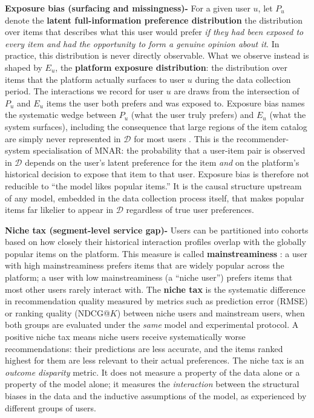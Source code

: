\documentclass[11pt,a4paper]{report}
\begin{document}
\textbf{Exposure bias (surfacing and missingness)-}
For a given user $u$, let $P_u$ denote the \textbf{latent full-information preference distribution} the distribution over items that describes what this user would prefer \emph{if they had been exposed to every item and had the opportunity to form a genuine opinion about it}. In practice, this distribution is never directly observable. What we observe instead is shaped by $E_u$, the \textbf{platform exposure distribution}: the distribution over items that the platform actually surfaces to user $u$ during the data collection period. The interactions we record for user $u$ are draws from the intersection of $P_u$ and $E_u$ items the user both prefers and was exposed to. Exposure bias names the systematic wedge between $P_u$ (what the user truly prefers) and $E_u$ (what the system surfaces), including the consequence that large regions of the item catalog are simply never represented in $\mathcal{D}$ for most users \citep{marlin2009mnar, schnabel2016ips}. This is the recommender-system specialisation of MNAR: the probability that a user-item pair is observed in $\mathcal{D}$ depends on the user's latent preference for the item \emph{and} on the platform's historical decision to expose that item to that user. Exposure bias is therefore not reducible to ``the model likes popular items.'' It is the causal structure upstream of any model, embedded in the data collection process itself, that makes popular items far likelier to appear in $\mathcal{D}$ regardless of true user preferences.

\textbf{Niche tax (segment-level service gap)-}
Users can be partitioned into cohorts based on how closely their historical interaction profiles overlap with the globally popular items on the platform. This measure is called \textbf{mainstreaminess} \citep{abdollahpouri2021usercentered}: a user with high mainstreaminess prefers items that are widely popular across the platform; a user with low mainstreaminess (a ``niche user'') prefers items that most other users rarely interact with. The \textbf{niche tax} is the systematic difference in recommendation quality measured by metrics such as prediction error (RMSE) or ranking quality (NDCG@$K$) between niche users and mainstream users, when both groups are evaluated under the \emph{same} model and experimental protocol. A positive niche tax means niche users receive systematically worse recommendations: their predictions are less accurate, and the items ranked highest for them are less relevant to their actual preferences. The niche tax is an \emph{outcome disparity} metric. It does not measure a property of the data alone or a property of the model alone; it measures the \emph{interaction} between the structural biases in the data and the inductive assumptions of the model, as experienced by different groups of users.
\end{document}
